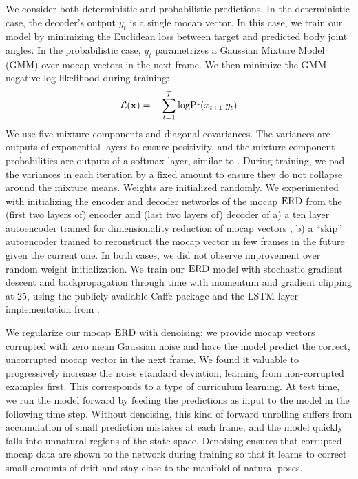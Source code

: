 \documentclass[10pt,twocolumn,letterpaper]{article}
\begin{document}
We consider both deterministic and probabilistic predictions. In the deterministic case, the decoder's output $y_t$ is a single mocap vector.  In this case, we train our model by minimizing the Euclidean loss between target and predicted body joint angles. In the probabilistic case, $y_t$  parametrizes  a Gaussian Mixture Model (GMM) over mocap vectors in the next frame.  We then  minimize the GMM negative log-likelihood during training:
\begin{equation}
 \mathcal{L}(\mathbf{x}) = - \displaystyle\sum_{t=1}^T\mathrm{log}\mathrm{Pr}(x_{t+1}|y_t)
\end{equation}
We use five mixture components and diagonal covariances. The variances are outputs of  exponential layers to ensure  positivity, and the mixture component probabilities are outputs of a softmax layer, similar to \cite{DBLP:journals/corr/Graves13}. During training, we  pad the variances in each iteration by a fixed amount to ensure they do not collapse around the mixture means.
Weights are initialized randomly. We experimented with initializing the encoder and decoder networks of the mocap $\text{ERD}$ from the (first two layers of) encoder and (last two layers of) decoder of a) a ten layer autoencoder trained for dimensionality reduction of mocap  vectors \cite{citeulike:778023}, 
  b) a ``skip'' autoencoder  trained to reconstruct the  mocap vector in few frames in the future given the current one. In both cases, we did not observe improvement over random weight initialization.  We train our $\text{ERD}$ model with stochastic gradient descent and backpropagation through time \cite{Williams95gradient-basedlearning} with momentum and gradient clipping at 25, using the publicly available Caffe package \cite{Jia13caffe} and the LSTM layer  implementation from \cite{DBLP:journals/corr/DonahueHGRVSD14}. 
  







We regularize  our mocap $\text{ERD}$ with denoising: we provide   mocap vectors corrupted with zero mean Gaussian noise \cite{Vincent:2010:SDA:1756006.1953039} and have the model  predict the correct, uncorrupted  mocap vector in the next frame. We found it valuable to progressively increase the noise standard deviation, learning from non-corrupted  examples first. This corresponds to a type of curriculum learning. At test time, we  run the model forward by feeding the predictions as input to the model in the following time step. Without  denoising, this kind of forward unrolling  suffers from accumulation of small prediction mistakes at each frame, and the model  
quickly falls into unnatural regions of the state space. 
Denoising ensures that corrupted mocap data are shown to the network during training so that it learns to  correct small amounts of drift and stay close to the manifold of natural poses.
\end{document}
